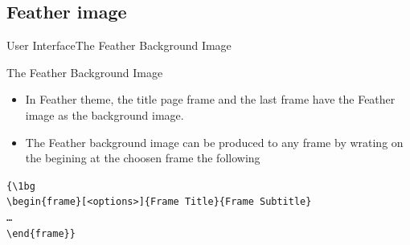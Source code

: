 \documentclass[10pt]{beamer}
\begin{document}
\subsection{Feather image}
\begin{frame}{User Interface}{The Feather Background Image}

\begin{block}{The Feather Background Image}
    \begin{itemize}
    \item In Feather theme, the title page frame and the last frame have the Feather image as the background image. 
    \item The Feather background image can be produced to any frame by wrating on the begining at the choosen frame the following
    \end{itemize} 
    
    \vspace{5pt} 
    
  {\tt \{\textbackslash 1bg\\
    \textbackslash begin\{frame\}[<options>]\{Frame Title\}\{Frame Subtitle\}\\
    \ldots\\
    \textbackslash end\{frame\}\}}
\end{block}
\end{frame}


{\1
\begin{frame}
\end{frame}}
\end{document}
